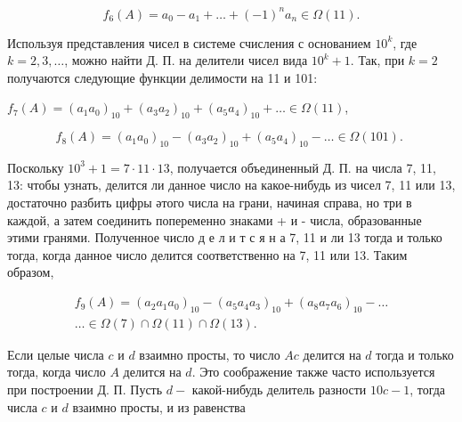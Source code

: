 \documentclass[10pt]{article}
\begin{document}
\[

f_{6}(A)=a_{0}-a_{1}+\ldots+(-1)^{n} a_{n} \in \Omega(11) .

\]



Используя представления чисел в системе счисления с основанием $10^{k}$, где $k=2,3, \ldots$, можно найти Д. П. на делители чисел вида $10^{k}+1$. Так, при $k=2$ получаются следующие функции делимости на 11 и 101:



$f_{7}(A)=\left(a_{1} a_{0}\right)_{10}+\left(a_{3} a_{2}\right)_{10}+\left(a_{5} a_{4}\right)_{10}+\ldots \in \Omega(11)$,



\[

f_{8}(A)=\left(a_{1} a_{0}\right)_{10}-\left(a_{3} a_{2}\right)_{10}+\left(a_{5} a_{4}\right)_{10}-\ldots \in \Omega(101) \text {. }

\]



Поскольку $10^{3}+1=7 \cdot 11 \cdot 13$, получается объединенный Д. П. на числа 7, 11, 13: чтобы узнать, делится ли данное число на какое-нибудь из чисел 7, 11 или 13, достаточно разбить цифры әтого числа на грани, начиная справа, но три в каждой, а затем соединить попеременно знаками + и - числа, образованные этими гранями. Полученное число д е л и т с я н а 7, 11 и ли 13 тогда и только тогда, когда данное число делится соответственно на 7, 11 или 13. Таким образом,



\[

\begin{gathered}

f_{9}(A)=\left(a_{2} a_{1} a_{0}\right)_{10}-\left(a_{5} a_{4} a_{3}\right)_{10}+\left(a_{8} a_{7} a_{6}\right)_{10}-\ldots \\

\ldots \in \Omega(7) \cap \Omega(11) \cap \Omega(13) .

\end{gathered}

\]



Если целые числа $c$ и $d$ взаимно просты, то число $A c$ делится на $d$ тогда и только тогда, когда число $A$ делится на $d$. Это соображение также часто используется при построении Д. П. Пусть $d-$ какой-нибудь делитель разности $10 c-1$, тогда числа $c$ и $d$ взаимно просты, и из равенства
\end{document}
